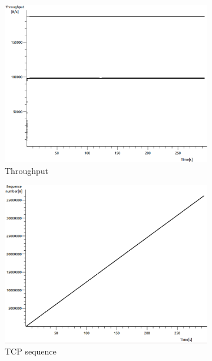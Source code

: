 \documentclass[conference,a4paper]{../../sty/IEEEtran}
\begin{document}
\begin{figure}
 \centering
 \begin{subfigure}[b]{0.2\textwidth}
  \includegraphics[width=\textwidth]{s4-0_thru}
  \caption{Throughput}
 \end{subfigure}
 \begin{subfigure}[b]{0.2\textwidth}
  \includegraphics[width=\textwidth]{s4-0_seq}
  \caption{TCP sequence}
 \end{subfigure}
 \begin{subfigure}[b]{0.2\textwidth}

\end{subfigure}
\end{figure}
\end{document}
